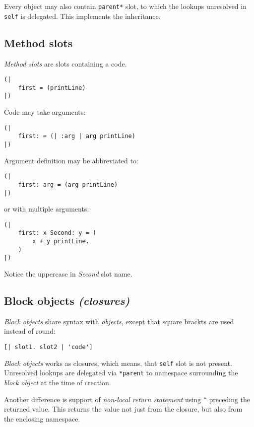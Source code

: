 \documentclass[10pt]{article}
\begin{document}
\begin{multicols*}{3}
Every object may also contain \texttt{parent*} slot, to which the lookups unresolved in \texttt{self} is delegated. This implements the inheritance.




\subsection{Method slots}

\textit{Method slots} are slots containing a code.

\begin{lstlisting}
(|
    first = (printLine)
|)
\end{lstlisting}

Code may take arguments:

\begin{lstlisting}
(|
    first: = (| :arg | arg printLine)
|)
\end{lstlisting}

Argument definition may be abbreviated to:

\begin{lstlisting}
(|
    first: arg = (arg printLine)
|)
\end{lstlisting}

or with multiple arguments:

\begin{lstlisting}
(|
    first: x Second: y = (
        x + y printLine.
    )
|)
\end{lstlisting}

Notice the uppercase in \textit{Second} slot name.




\subsection{Block objects \textit{(closures)}}
\textit{Block objects} share syntax with \textit{objects}, except that square brackts are used instead of round:

\begin{lstlisting}
[| slot1. slot2 | 'code']
\end{lstlisting}

\textit{Block objects} works as closures, which means, that \texttt{self} slot is not present. Unresolved lookups are delegated via \texttt{*parent} to namespace surrounding the \textit{block object} at the time of creation.

Another difference is support of \textit{non-local return statement} using \texttt{\^} preceding the returned value. This returns the value not just from the closure, but also from the enclosing namespace.


\end{multicols*}
\end{document}
